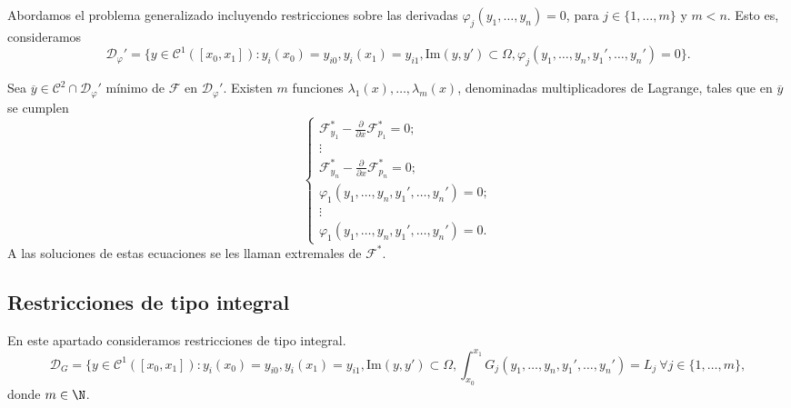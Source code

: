 \documentclass{article}
\begin{document}
Abordamos el problema generalizado incluyendo restricciones sobre las derivadas
$\varphi_j(y_1, \ldots, y_n) = 0$, para $j \in \{1, \ldots, m\}$ y $m < n$. Esto es, consideramos
\[\mathcal{D}_\varphi' = \{y \in \mathcal{C}^1([x_0, x_1]): y_i(x_0) = y_{i0}, y_i(x_1) = y_{i1},
  \mathrm{Im}(y, y') \subset \Omega, \varphi_j(y_1, \ldots, y_n, y_1', \ldots, y_n') = 0 \}.\]

\begin{prop} \label{prop:ml:ad}
  Sea $\overline{y} \in \mathcal{C}^2 \cap \mathcal{D}_\varphi'$ mínimo de $\mathcal{F}$ en
  $\mathcal{D}_\varphi'$. Existen $m$ funciones $\lambda_1(x), \ldots, \lambda_m(x)$, denominadas
  multiplicadores de Lagrange, tales que en $\overline{y}$ se cumplen
  \[
    \begin{cases}
      \mathcal{F}_{y_1}^* - \frac{\partial}{\partial x} \mathcal{F}_{p_1}^* = 0; \\
      \vdots \\
      \mathcal{F}_{y_n}^* - \frac{\partial}{\partial x} \mathcal{F}_{p_n}^* = 0; \\
      \varphi_1(y_1, \dots, y_n, y_1', \ldots, y_n') = 0; \\
      \vdots \\
      \varphi_1(y_1, \dots, y_n, y_1', \ldots, y_n') = 0.
    \end{cases}
  \]
  A las soluciones de estas ecuaciones se les llaman extremales de $\mathcal{F}^*$.
\end{prop}

\subsection{Restricciones de tipo integral}

En este apartado consideramos restricciones de tipo integral.
\[\mathcal{D}_G = \{y \in \mathcal{C}^1([x_0, x_1]): y_i(x_0) = y_{i0}, y_i(x_1) = y_{i1},
  \mathrm{Im}(y, y') \subset \Omega, \int_{x_0}^{x_1}G_j(y_1, \ldots, y_n, y_1', \ldots, y_n') = L_j
  \ \forall j \in \{1, \ldots, m\},\] donde $m \in \N$.
\end{document}
